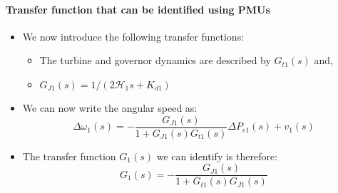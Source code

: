 \begin{frame}{\secname}
	\framesubtitle{Transfer function that can be identified using PMUs}
	\begin{itemize}
		\item We now introduce the following transfer functions:
			\begin{itemize}
				\item The turbine and governor dynamics are described by $G_{t1}(s)$ and,
				\item $G_{J1}(s) = 1/(2\mathcal{H}_1s+K_{d1})$
			\end{itemize}
		\item We can now write the angular speed as:
			\begin{equation}\label{eq:f1}
				\Delta \omega_1(s) = -\frac{G_{J1}(s)}{1+G_{J1}(s)G_{t1}(s)} \Delta P_{e1}(s) + v_1(s)
			\end{equation}
		\item The transfer function $G_1(s)$ we can identify is therefore:
			\begin{equation}
					G_1(s) = -\frac{G_{J1}(s)}{1+G_{t1}(s)G_{J1}(s)}
			\end{equation}
	\end{itemize}
\end{frame}
